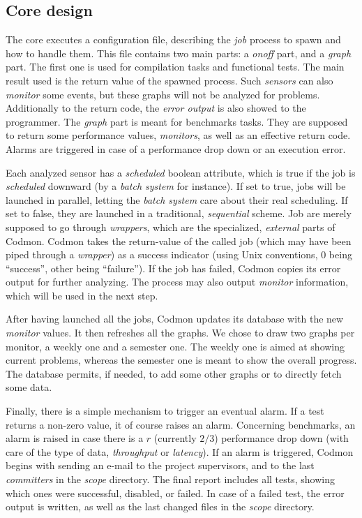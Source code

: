 \documentclass[a4paper,10pt]{article}
\renewcommand{\|}{\url|}
\begin{document}
\subsection{Core design}



The core executes a configuration file, describing the \emph{job} process to spawn and how to handle them. This file contains two main parts: a \emph{onoff} part, and a \emph{graph} part. The first one is used for compilation tasks and functional tests. The main result used is the return value of the spawned process. Such \emph{sensors} can also \emph{monitor} some events, but these graphs will not be analyzed for problems. Additionally to the return code, the \emph{error output} is also showed to the programmer. The \emph{graph} part is meant for benchmarks tasks. They are supposed to return some performance values, \emph{monitors}, as well as an effective return code. Alarms are triggered in case of a performance drop down or an execution error.

Each analyzed sensor has a \emph{scheduled} boolean attribute, which is true if the job is \emph{scheduled} downward (by a \emph{batch system} for instance). If set to true, jobs will be launched in parallel, letting the \emph{batch system} care about their real scheduling. If set to false, they are launched in a traditional, \emph{sequential} scheme. Job are merely supposed to go through \emph{wrappers}, which are the specialized, \emph{external} parts of Codmon. Codmon takes the return-value of the called job (which may have been piped through a \emph{wrapper}) as a success indicator (using Unix conventions, 0 being ``success'', other being ``failure''). If the job has failed, Codmon copies its error output for further analyzing. The process may also output \emph{monitor} information, which will be used in the next step.

After having launched all the jobs, Codmon updates its database with the new \emph{monitor} values. It then refreshes all the graphs. We chose to draw two graphs per monitor, a weekly one and a semester one. The weekly one is aimed at showing current problems, whereas the semester one is meant to show the overall progress. The database permits, if needed, to add some other graphs or to directly fetch some data.

Finally, there is a simple mechanism to trigger an eventual alarm. If a test returns a non-zero value, it of course raises an alarm. Concerning benchmarks, an alarm is raised in case there is a $r$ (currently $2/3$) performance drop down (with care of the type of data, \emph{throughput} or \emph{latency}). If an alarm is triggered, Codmon begins with sending an e-mail to the project supervisors, and to the last \emph{committers} in the \emph{scope} directory. The final report includes all tests, showing which ones were successful, disabled, or failed. In case of a failed test, the error output is written, as well as the last changed files in the \emph{scope} directory.
\end{document}
